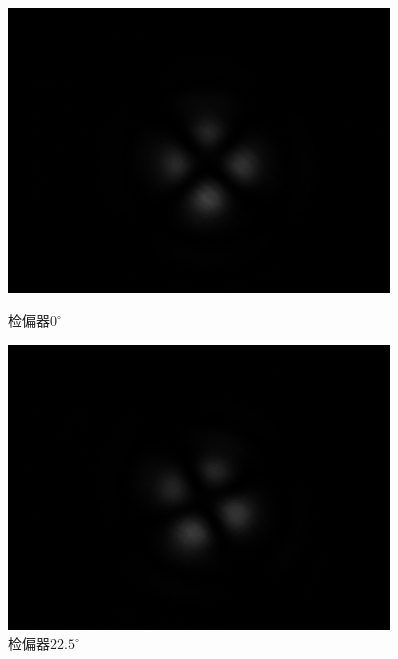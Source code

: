 \documentclass[a4paper,UTF8]{ctexart}
\begin{document}
\begin{figure}[H]
    \centering
    \begin{minipage}[b]{0.45\textwidth}
        \centering
        \includegraphics[width=0.9\textwidth]{./fig/2_1.png}
        \caption{检偏器$0^{\circ}$}
    \end{minipage}
    \begin{minipage}[b]{0.45\textwidth}
        \centering
        \includegraphics[width=0.9\textwidth]{./fig/2_4.png}
        \caption{检偏器$22.5^{\circ}$}
    \end{minipage}
\end{figure}
\end{document}
